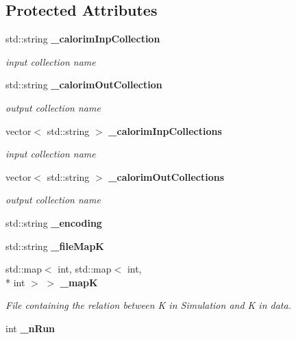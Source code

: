 \subsection*{Protected Attributes}
\begin{DoxyCompactItemize}
\item 
std\-::string {\bf \-\_\-calorim\-Inp\-Collection}\label{classCALICE_1_1Ahc2MIP2GeVProcessor_ac98bb5f559ade9930981b45e6af647df}

\begin{DoxyCompactList}\small\item\em input collection name \end{DoxyCompactList}\item 
std\-::string {\bf \-\_\-calorim\-Out\-Collection}\label{classCALICE_1_1Ahc2MIP2GeVProcessor_abc3aa68a225b5247bcf939ac444e8e3c}

\begin{DoxyCompactList}\small\item\em output collection name \end{DoxyCompactList}\item 
vector$<$ std\-::string $>$ {\bf \-\_\-calorim\-Inp\-Collections}\label{classCALICE_1_1Ahc2MIP2GeVProcessor_a1cbcfad20f4a1442e348069c0ee3ce4a}

\begin{DoxyCompactList}\small\item\em input collection name \end{DoxyCompactList}\item 
vector$<$ std\-::string $>$ {\bf \-\_\-calorim\-Out\-Collections}\label{classCALICE_1_1Ahc2MIP2GeVProcessor_aeac8962705d46a9508e48c5d09a11e80}

\begin{DoxyCompactList}\small\item\em output collection name \end{DoxyCompactList}\item 
std\-::string {\bfseries \-\_\-encoding}\label{classCALICE_1_1Ahc2MIP2GeVProcessor_adab396f0c5d55740e531225e7e4ce65d}

\item 
std\-::string {\bfseries \-\_\-file\-Map\-K}\label{classCALICE_1_1Ahc2MIP2GeVProcessor_af0b9513edea9da93c8a3a3c52f2e39b4}

\item 
std\-::map$<$ int, std\-::map$<$ int, \\*
int $>$ $>$ {\bf \-\_\-map\-K}
\begin{DoxyCompactList}\small\item\em File containing the relation between K in Simulation and K in data. \end{DoxyCompactList}\item 
int {\bf \-\_\-n\-Run}\label{classCALICE_1_1Ahc2MIP2GeVProcessor_af41b36a5429f50a0eab3ac38a5f66c7f}


\end{DoxyCompactItemize}
